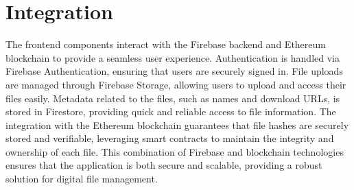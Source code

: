 \documentclass[12pt,a4paper]{report}
\begin{document}




\section{Integration}
\par The frontend components interact with the Firebase 
backend and Ethereum blockchain to provide a seamless user 
experience. Authentication is handled via Firebase 
Authentication, ensuring that users are securely signed in. 
File uploads are managed through Firebase Storage, allowing 
users to upload and access their files easily. Metadata related 
to the files, such as names and download URLs, is stored in 
Firestore, providing quick and reliable access to file 
information. The integration with the Ethereum blockchain 
guarantees that file hashes are securely stored and verifiable, 
leveraging smart contracts to maintain the integrity and 
ownership of each file. This combination of Firebase and 
blockchain technologies ensures that the application is both 
secure and scalable, providing a robust solution for digital
 file management.
\end{document}
